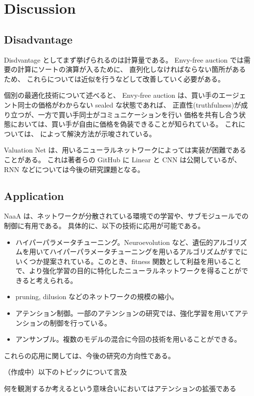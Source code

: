\section{Discussion}
\subsection{Disadvantage}
Disdvantage としてまず挙げられるのは計算量である。
Envy-free auction では需要の計算にソートの演算が入るために、
直列化しなければならない箇所があるため、
これらについては近似を行うなどして改善していく必要がある。

個別の最適化技術について述べると、
Envy-free auction は、買い手のエージェント同士の価格がわからない sealed な状態であれば、
正直性(truthfulness)が成り立つが、一方で買い手同士がコミュニケーションを行い
価格を共有し合う状態においては、買い手が自由に価格を偽装できることが知られている。
これについては、\cite{goldberg2006competitive} によって解決方法が示唆されている。

Valuation Net は、用いるニューラルネットワークによっては実装が困難であることがある。
これは著者らの GitHub に Linear と CNN は公開しているが、
RNN などについては今後の研究課題となる。

\subsection{Application}
NaaA は、ネットワークが分散されている環境での学習や、サブモジュールでの制御に有用である。
具体的に、以下の技術に応用が可能である。
\begin{itemize}
\item ハイパーパラメータチューニング。Neuroevolution など、遺伝的アルゴリズムを用いてハイパーパラメータチューニングを用いるアルゴリズムがすでにいくつか提案されている。このとき、fitness 関数として利益を用いることで、より強化学習の目的に特化したニューラルネットワークを得ることができると考えられる。
\item pruning, dilusion などのネットワークの規模の縮小。
\item アテンション制御。一部のアテンションの研究では、強化学習を用いてアテンションの制御を行っている。
\item アンサンブル。複数のモデルの混合に今回の技術を用いることができる。
\end{itemize}
これらの応用に関しては、今後の研究の方向性である。


（作成中）以下のトピックについて言及

何を観測するか考えるという意味合いにおいてはアテンションの拡張である

